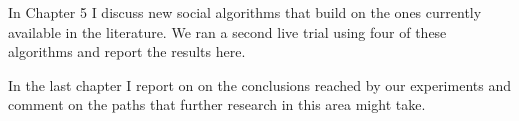 In Chapter 5 I discuss new social algorithms that build on the ones currently available in the literature. We ran a second live trial using four of these algorithms and report the results here. 

In the last chapter I report on on the conclusions reached by our experiments and comment on the paths that further research in this area might take.

